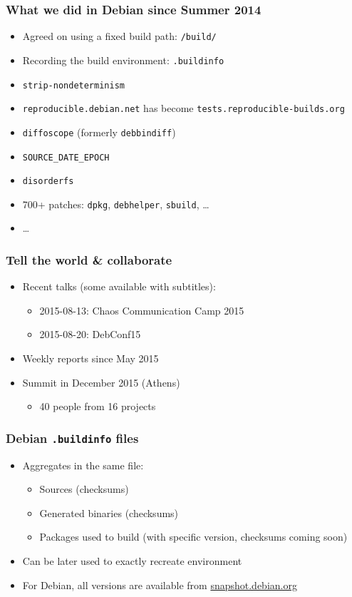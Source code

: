 \documentclass[14pt]{beamer}
\begin{document}
\begin{frame}
 \frametitle{What we did in Debian since Summer 2014}

 \begin{itemize}
  \item Agreed on using a fixed build path: \texttt{/build/}
  \item Recording the build environment: \texttt{.buildinfo}
  \item \texttt{strip-nondeterminism}
  \item \texttt{reproducible.debian.net} has become
  \texttt{tests.reproducible-builds.org}
  \item \texttt{diffoscope} (formerly \texttt{debbindiff})
  \item \texttt{SOURCE\_DATE\_EPOCH}
  \item \texttt{disorderfs}
  \item 700+ patches: \texttt{dpkg}, \texttt{debhelper}, \texttt{sbuild}, …
  \item …
 \end{itemize}
\end{frame}


\begin{frame}
 \frametitle{Tell the world \& collaborate}

 \begin{itemize}
  \item Recent talks (some available with subtitles):
   \begin{itemize}
    \item 2015-08-13: Chaos Communication Camp 2015
    \item 2015-08-20: DebConf15
   \end{itemize}
  \item Weekly reports since May 2015
  \item Summit in December 2015 (Athens)
   \begin{itemize}
    \item 40 people from 16 projects
   \end{itemize}
 \end{itemize}
\end{frame}




\begin{frame}
 \frametitle{Debian \texttt{.buildinfo} files}

 \begin{itemize}
  \item Aggregates in the same file:
   \begin{itemize}
    \item Sources (checksums)
    \item Generated binaries (checksums)
    \item Packages used to build (with specific version, checksums coming soon)
   \end{itemize}
  \item Can be later used to exactly recreate environment
  \item For Debian, all versions are available from \url{snapshot.debian.org}
 \end{itemize}
\end{frame}
\end{document}
